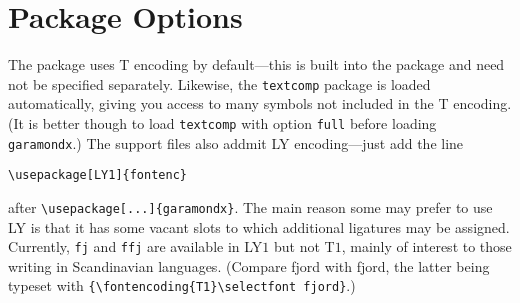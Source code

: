 \documentclass[11pt]{article}
\begin{document}
\section{Package Options}
The package uses T encoding by default---this is built into the package and need not be specified separately. Likewise, the \texttt{textcomp} package is loaded automatically, giving you access to many symbols not included in the T encoding. (It is better though to load {\tt textcomp} with option {\tt full} before loading {\tt garamondx}.) The support files also addmit LY encoding---just add the line
\begin{verbatim}
\usepackage[LY1]{fontenc} 
\end{verbatim}
after \verb|\usepackage[...]{garamondx}|. The main reason some may prefer to use LY is that it has some vacant slots to which additional ligatures may be assigned. Currently, {\tt fj} and {\tt ffj} are available in LY$1$ but not T$1$, mainly of interest to those writing in Scandinavian languages. (Compare fjord with {\selectfont fjord}, the latter being typeset with \verb|{\fontencoding{T1}\selectfont fjord}|.)
\end{document}
